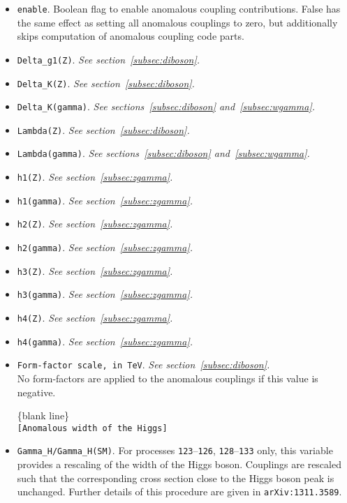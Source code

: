 \documentclass{article}
\begin{document}
\begin{itemize}
\begin{center}
\{blank line\} \\
{\tt [Anomalous couplings of the W and Z] }
\end{center}
\item {\tt enable}. Boolean flag to enable anomalous coupling contributions. False has the same effect as 
setting all anomalous couplings to zero, but additionally skips computation of anomalous coupling code parts.
\item {\tt Delta\_g1(Z)}. {\it See section~\ref{subsec:diboson}.}
\item {\tt Delta\_K(Z)}. {\it See section~\ref{subsec:diboson}.}
\item {\tt Delta\_K(gamma)}. {\it See sections~\ref{subsec:diboson} and~\ref{subsec:wgamma}.}
\item {\tt Lambda(Z)}. {\it See section~\ref{subsec:diboson}.}
\item {\tt Lambda(gamma)}. {\it See sections~\ref{subsec:diboson} and~\ref{subsec:wgamma}.}
\item {\tt h1(Z)}. {\it See section~\ref{subsec:zgamma}.}
\item {\tt h1(gamma)}. {\it See section~\ref{subsec:zgamma}.}
\item {\tt h2(Z)}. {\it See section~\ref{subsec:zgamma}.}
\item {\tt h2(gamma)}. {\it See section~\ref{subsec:zgamma}.}
\item {\tt h3(Z)}. {\it See section~\ref{subsec:zgamma}.}
\item {\tt h3(gamma)}. {\it See section~\ref{subsec:zgamma}.}
\item {\tt h4(Z)}. {\it See section~\ref{subsec:zgamma}.}
\item {\tt h4(gamma)}. {\it See section~\ref{subsec:zgamma}.}
\item {\tt Form-factor scale, in TeV}. {\it See section~\ref{subsec:diboson}.} \\
No form-factors are applied to the anomalous couplings if this value is negative.

\begin{center}
\{blank line\} \\
{\tt [Anomalous width of the Higgs] }
\end{center}

\item {\tt Gamma\_H/Gamma\_H(SM)}. For processes {\tt 123}--{\tt 126}, {\tt 128}--{\tt 133} only,
this variable provides a rescaling of the width of the Higgs boson.  Couplings are rescaled such that the
corresponding cross section close to the Higgs boson peak is unchanged.  Further details of this procedure are given in
{\tt arXiv:1311.3589}.

\end{itemize}
\end{document}
